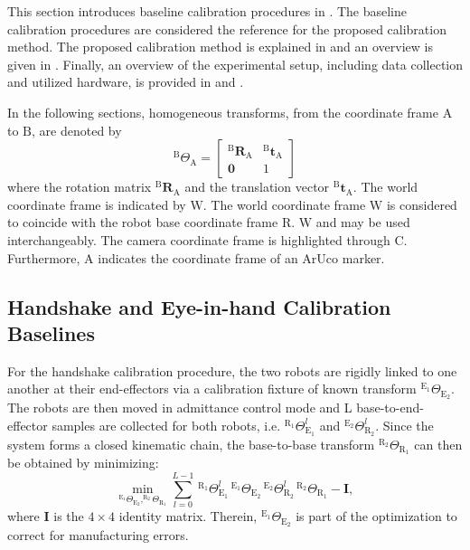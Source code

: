 This section introduces baseline calibration procedures in . The baseline calibration procedures are considered the reference for the proposed calibration method. The proposed calibration method is explained in  and an overview is given in . Finally, an overview of the experimental setup, including data collection and utilized hardware, is provided in  and .

In the following sections, homogeneous transforms, from the coordinate frame $\text{A}$ to $\text{B}$, are denoted by $$^\text{B}\Theta_\text{A}=\begin{bmatrix} ^\text{B}\mathbf{R}_\text{A} & ^\text{B}\textbf{t}_\text{A} \\ \mathbf{0} & 1 \end{bmatrix}$$ where the rotation matrix $^\text{B}\mathbf{R}_\text{A}$ and the translation vector $^\text{B}\textbf{t}_\text{A}$. The world coordinate frame is indicated by $\text{W}$. The world coordinate frame $\text{W}$ is considered to coincide with the robot base coordinate frame $\text{R}$. $\text{W}$ and  may be used interchangeably. The camera coordinate frame is highlighted through $\text{C}$. Furthermore, $\text{A}$ indicates the coordinate frame of an ArUco marker.

\subsection{Handshake and Eye-in-hand Calibration Baselines}
\label{c1:sec:handshake_and_eye_in_hand_calibration}
For the handshake calibration procedure, the two robots are rigidly linked to one another at their end-effectors via a calibration fixture of known transform $^{\text{E}_1}\Theta_{\text{E}_2}$. The robots are then moved in admittance control mode and L base-to-end-effector samples are collected for both robots, i.e. $^{\text{R}_1}\Theta^l_{\text{E}_1}$ and $^{\text{E}_2}\Theta^l_{\text{R}_2}$. Since the system forms a closed kinematic chain, the base-to-base transform $^{\text{R}_2}\Theta_{\text{R}_1}$ can then be obtained by minimizing:
%
\begin{equation}
    \label{c1:eq:handsake}
    \min_{^{\text{E}_1}\Theta_{\text{E}_2}, ^{\text{R}_2}\Theta_{\text{R}_1}} \sum_{l=0}^{L-1}\,^{\text{R}_1}\Theta^l_{\text{E}_1}\,^{\text{E}_1}\Theta_{\text{E}_2}\,^{\text{E}_2}\Theta^l_{\text{R}_2}\,^{\text{R}_2}\Theta_{\text{R}_1} - \mathbf{I},
\end{equation}
%
where $\mathbf{I}$ is the $4\times4$ identity matrix. Therein, $^{\text{E}_1}\Theta_{\text{E}_2}$ is part of the optimization to correct for manufacturing errors.

